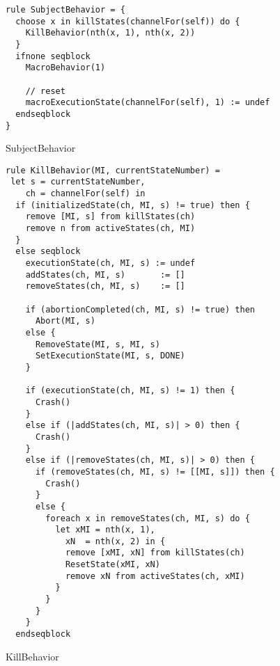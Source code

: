 \begin{listing}[H]
\begin{verbatim}
rule SubjectBehavior = {
  choose x in killStates(channelFor(self)) do {
    KillBehavior(nth(x, 1), nth(x, 2))
  }
  ifnone seqblock
    MacroBehavior(1)

    // reset
    macroExecutionState(channelFor(self), 1) := undef
  endseqblock
}
\end{verbatim}
\caption{SubjectBehavior}
\label{lst:asm:SubjectBehavior}
\end{listing}




\begin{listing}[H]
\begin{verbatim}
rule KillBehavior(MI, currentStateNumber) =
 let s = currentStateNumber,
    ch = channelFor(self) in
  if (initializedState(ch, MI, s) != true) then {
    remove [MI, s] from killStates(ch)
    remove n from activeStates(ch, MI)
  }
  else seqblock
    executionState(ch, MI, s) := undef
    addStates(ch, MI, s)       := []
    removeStates(ch, MI, s)    := []

    if (abortionCompleted(ch, MI, s) != true) then
      Abort(MI, s)
    else {
      RemoveState(MI, s, MI, s)
      SetExecutionState(MI, s, DONE)
    }

    if (executionState(ch, MI, s) != 1) then {
      Crash()
    }
    else if (|addStates(ch, MI, s)| > 0) then {
      Crash()
    }
    else if (|removeStates(ch, MI, s)| > 0) then {
      if (removeStates(ch, MI, s) != [[MI, s]]) then {
        Crash()
      }
      else {
        foreach x in removeStates(ch, MI, s) do {
          let xMI = nth(x, 1),
            xN  = nth(x, 2) in {
            remove [xMI, xN] from killStates(ch)
            ResetState(xMI, xN)
            remove xN from activeStates(ch, xMI)
          }
        }
      }
    }
  endseqblock
\end{verbatim}
\caption{KillBehavior}
\label{lst:asm:KillBehavior}
\end{listing}




